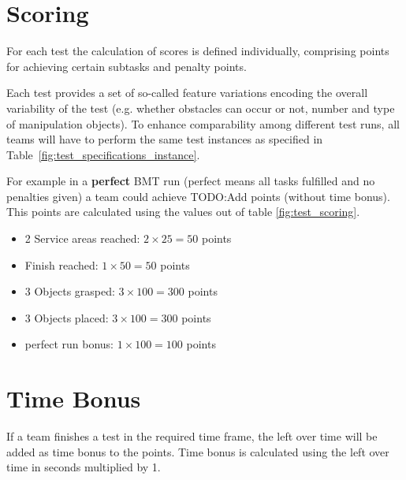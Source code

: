 \section{Scoring} \label{sec:ScoringAndRanking}

For each test the calculation of scores is defined individually, comprising points for achieving certain subtasks and penalty points.

Each test provides a set of so-called feature variations encoding the overall variability of the test (e.g. whether
obstacles can occur or not, number and type of manipulation objects). To enhance comparability among different test
runs, all teams will have to perform the same test instances as specified in Table~\ref{fig:test_specifications_instance}.

For example in a \textbf{perfect} BMT run (perfect means all tasks fulfilled and no penalties given) a team could achieve TODO:Add points (without time bonus). This points are calculated using the values out of table \ref{fig:test_scoring}.

\begin{itemize}
	\item 2 Service areas reached: $2 \times 25 = 50$ points
	\item Finish reached: $1 \times 50 = 50 $ points
	\item 3 Objects grasped: $3 \times 100 = 300 $ points
	\item 3 Objects placed: $3 \times 100 = 300  $ points
	\item perfect run bonus: $1 \times 100 = 100 $ points
\end{itemize}


\section{Time Bonus}
If a team finishes a test in the required time frame, the left over time will be added as time bonus to the points. 
Time bonus is calculated using the left over time in seconds multiplied by 1. 


